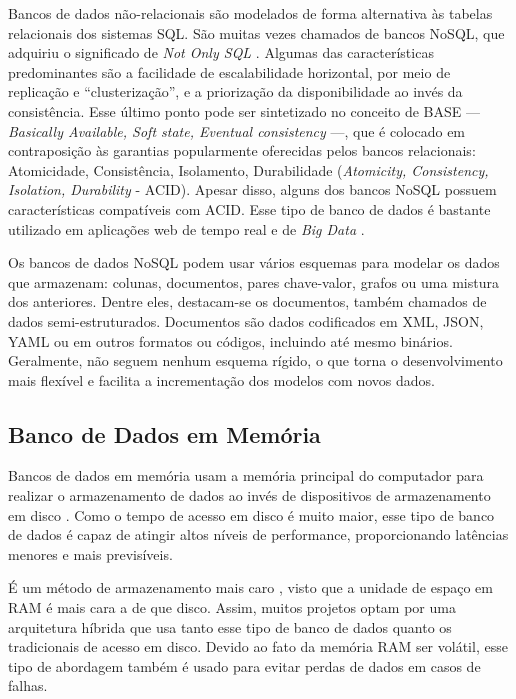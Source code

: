 Bancos de dados não-relacionais são modelados de forma alternativa às tabelas relacionais dos sistemas SQL. São muitas vezes chamados de bancos NoSQL, que adquiriu o significado de \emph{Not Only SQL} \cite{nosql}. Algumas das características predominantes são a facilidade de escalabilidade horizontal, por meio de replicação e ``clusterização'', e a priorização da disponibilidade ao invés da consistência. Esse último ponto pode ser sintetizado no conceito de BASE --- \emph{Basically Available, Soft state, Eventual consistency} ---, que é colocado em contraposição às garantias popularmente oferecidas pelos bancos relacionais: Atomicidade, Consistência, Isolamento, Durabilidade (\emph{Atomicity, Consistency, Isolation, Durability} - ACID). Apesar disso, alguns dos bancos NoSQL possuem características compatíveis com ACID. Esse tipo de banco de dados é bastante utilizado em aplicações web de tempo real e de \emph{Big Data} \cite{pereira}.

Os bancos de dados NoSQL podem usar vários esquemas para modelar os dados que armazenam: colunas, documentos, pares chave-valor, grafos ou uma mistura dos anteriores. Dentre eles, destacam-se os documentos, também chamados de dados semi-estruturados. Documentos são dados codificados em XML, JSON, YAML ou em outros formatos ou códigos, incluindo até mesmo binários. Geralmente, não seguem nenhum esquema rígido, o que torna o desenvolvimento mais flexível e facilita a incrementação dos modelos com novos dados.

\subsection{Banco de Dados em Memória}

Bancos de dados em memória usam a memória principal do computador para realizar o armazenamento de dados ao invés de dispositivos de armazenamento em disco \cite{raima}. Como o tempo de acesso em disco é muito maior, esse tipo de banco de dados é capaz de atingir altos níveis de performance, proporcionando latências menores e mais previsíveis.

É um método de armazenamento mais caro \cite{mullins}, visto que a unidade de espaço em RAM é mais cara a de que disco. Assim, muitos projetos optam por uma arquitetura híbrida que usa tanto esse tipo de banco de dados quanto os tradicionais de acesso em disco. Devido ao fato da memória RAM ser volátil, esse tipo de abordagem também é usado para evitar perdas de dados em casos de falhas.

